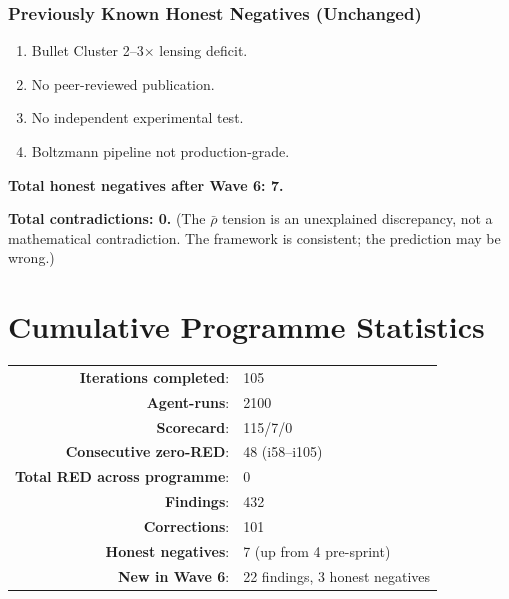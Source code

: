 \documentclass[11pt,a4paper]{article}
\begin{document}
\section{Previously Known Honest Negatives (Unchanged)}

\begin{enumerate}[resume]
\item Bullet Cluster 2--3$\times$ lensing deficit.
\item No peer-reviewed publication.
\item No independent experimental test.
\item Boltzmann pipeline not production-grade.
\end{enumerate}

\textbf{Total honest negatives after Wave 6: 7.}

\textbf{Total contradictions: 0.} (The $\bar\rho$ tension is an unexplained
discrepancy, not a mathematical contradiction. The framework is consistent;
the prediction may be wrong.)


\newpage
\part{Cumulative Programme Statistics}
\label{part:stats}

\begin{tcolorbox}[colback=green!5!white, colframe=dfdgreen,
  title=\textbf{PROGRAMME STATE AFTER i105}]
\begin{center}
\begin{tabular}{rl}
\textbf{Iterations completed}: & 105 \\
\textbf{Agent-runs}: & 2100 \\
\textbf{Scorecard}: & 115/7/0 \\
\textbf{Consecutive zero-RED}: & 48 (i58--i105) \\
\textbf{Total RED across programme}: & 0 \\
\textbf{Findings}: & 432 \\
\textbf{Corrections}: & 101 \\
\textbf{Honest negatives}: & 7 (up from 4 pre-sprint) \\
\textbf{New in Wave 6}: & 22 findings, 3 honest negatives \\
\end{tabular}
\end{center}
\end{tcolorbox}
\end{document}
